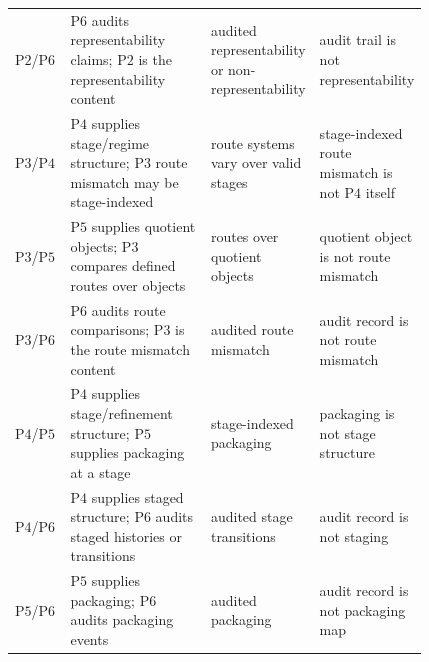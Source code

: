 \documentclass[11pt]{article}
\theoremstyle{definition}
\newcommand{\Ptwo}{\ensuremath{\mathrm{P2}}}
\newcommand{\Pthree}{\ensuremath{\mathrm{P3}}}
\newcommand{\Pfour}{\ensuremath{\mathrm{P4}}}
\newcommand{\Pfive}{\ensuremath{\mathrm{P5}}}
\newcommand{\Psix}{\ensuremath{\mathrm{P6}}}
\begin{document}
\begin{landscape}
\begin{table}
\begin{tabular}{@{}lp{0.34\linewidth}p{0.24\linewidth}p{0.24\linewidth}@{}}
\Ptwo{}/\Psix{} & \Psix{} audits representability claims; \Ptwo{} is the representability content & audited representability or non-representability & audit trail is not representability \\
\Pthree{}/\Pfour{} & \Pfour{} supplies stage/regime structure; \Pthree{} route mismatch may be stage-indexed & route systems vary over valid stages & stage-indexed route mismatch is not \Pfour{} itself \\
\Pthree{}/\Pfive{} & \Pfive{} supplies quotient objects; \Pthree{} compares defined routes over objects & routes over quotient objects & quotient object is not route mismatch \\
\Pthree{}/\Psix{} & \Psix{} audits route comparisons; \Pthree{} is the route mismatch content & audited route mismatch & audit record is not route mismatch \\
\Pfour{}/\Pfive{} & \Pfour{} supplies stage/refinement structure; \Pfive{} supplies packaging at a stage & stage-indexed packaging & packaging is not stage structure \\
\Pfour{}/\Psix{} & \Pfour{} supplies staged structure; \Psix{} audits staged histories or transitions & audited stage transitions & audit record is not staging \\
\Pfive{}/\Psix{} & \Pfive{} supplies packaging; \Psix{} audits packaging events & audited packaging & audit record is not packaging map \\
\bottomrule
\end{tabular}
\end{table}
\end{landscape}
 
\end{document}
